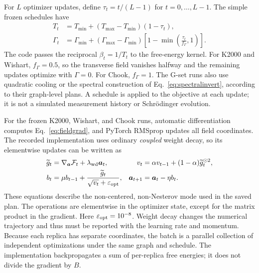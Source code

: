 For $L$ optimizer updates, define $\tau_t=t/(L-1)$ for
$t=0,\ldots,L-1$. The simple frozen schedules have
\begin{align}
 T_t&=T_{\min}+(T_{\max}-T_{\min})(1-\tau_t),
 \label{eq:tempcurve}\\
 \Gamma_t&=\Gamma_{\min}+
 (\Gamma_{\max}-\Gamma_{\min})
 \left[1-\min\!\left(\frac{\tau_t}{f_\Gamma},1\right)\right].
 \label{eq:gammacurve}
\end{align}
The code passes the reciprocal $\beta_t=1/T_t$ to the free-energy
kernel. For K2000 and Wishart, $f_\Gamma=0.5$, so the transverse field
vanishes halfway and the remaining updates optimize with $\Gamma=0$.
For Chook, $f_\Gamma=1$. The G-set runs also use quadratic cooling or the
spectral construction of Eq.~\eqref{eq:spectralinvert}, according to their
graph-level plans. A schedule is applied to the objective at each update;
it is not a simulated measurement history or Schr\"odinger evolution.

For the frozen K2000, Wishart, and Chook runs, automatic differentiation
computes Eq.~\eqref{eq:fieldgrad}, and PyTorch RMSprop updates all field
coordinates. The recorded implementation uses ordinary \emph{coupled}
weight decay, so its elementwise updates can be written as
\begin{align}
 \widetilde g_t&=\nabla_{\bm a}\mathcal F_t+\lambda_{\rm wd}\bm a_t,
 &v_t&=\alpha v_{t-1}+(1-\alpha)\widetilde g_t^{\odot2},
 \label{eq:rmsprop1}\\
 b_t&=\mu b_{t-1}+\frac{\widetilde g_t}{\sqrt{v_t}+\varepsilon_{\rm opt}},
 &\bm a_{t+1}&=\bm a_t-\eta b_t.
 \label{eq:rmsprop2}
\end{align}
These equations describe the non-centered, non-Nesterov mode used in the
saved plan. The operations are elementwise in the optimizer state, except
for the matrix product in the gradient. Here
$\varepsilon_{\rm opt}=10^{-8}$. Weight decay changes the numerical trajectory
and thus must be reported with the learning rate and momentum.
Because each replica has separate coordinates, the batch is a parallel
collection of independent optimizations under the same graph and schedule.
The implementation backpropagates a sum of per-replica free energies; it
does not divide the gradient by $B$.

